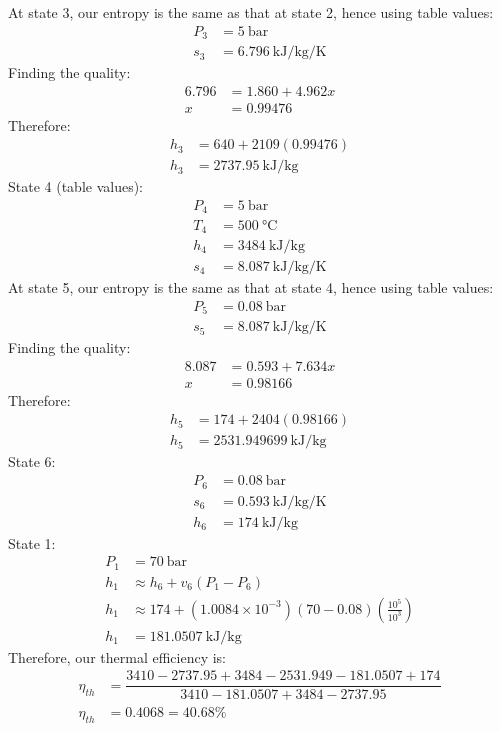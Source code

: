 \documentclass[11pt]{article}
\numberwithin{equation}{section}
\begin{document}
At state 3, our entropy is the same as that at state 2, hence using table values:
\begin{align}
    P_3 &= \SI{5}{\bar}\\
    s_3 &= \SI{6.796}{\kilo\joule\per\kg\per\kelvin}
\end{align}
Finding the quality:
\begin{align}
    6.796 &= 1.860 + 4.962x\\
    x &= 0.99476
\end{align}
Therefore:
\begin{align}
    h_3 &= 640 + 2109\left(0.99476\right)\\
    h_3 &= \SI{2737.95}{\kilo\joule\per\kg}
\end{align}
State 4 (table values):
\begin{align}
    P_4 &= \SI{5}{\bar}\\
    T_4 &= \SI{500}{\celsius}\\
    h_4 &= \SI{3484}{\kilo\joule\per\kg}\\
    s_4 &= \SI{8.087}{\kilo\joule\per\kg\per\kelvin}
\end{align}
At state 5, our entropy is the same as that at state 4, hence using table values:
\begin{align}
    P_5 &= \SI{0.08}{\bar}\\
    s_5 &= \SI{8.087}{\kilo\joule\per\kg\per\kelvin}
\end{align}
Finding the quality:
\begin{align}
    8.087 &= 0.593 + 7.634x\\
    x &= 0.98166
\end{align}
Therefore:
\begin{align}
    h_5 &= 174 + 2404(0.98166)\\
    h_5 &= \SI{2531.949699}{\kilo\joule\per\kg}
\end{align}
State 6:
\begin{align}
    P_6 &= \SI{0.08}{\bar}\\
    s_6 &= \SI{0.593}{\kilo\joule\per\kg\per\kelvin}\\
    h_6 &= \SI{174}{\kilo\joule\per\kg}
\end{align}
State 1:
\begin{align}
    P_1 &= \SI{70}{\bar}\\
    h_1 & \approx h_6 + v_6 \left(P_1 - P_6\right)\\
    h_1 & \approx 174 + \left(1.0084\times 10^{-3}\right)\left(70-0.08\right)\left(\frac{10^5}{10^3}\right)\\
    h_1 &= \SI{181.0507}{\kilo\joule\per\kg}
\end{align}
Therefore, our thermal efficiency is:
\begin{align}
    \eta_{th} &= \dfrac{3410-2737.95+3484-2531.949-181.0507+174}{3410 -181.0507+3484-2737.95}\\
    \eta_{th} &= 0.4068 = 40.68\%
\end{align}
\end{document}
